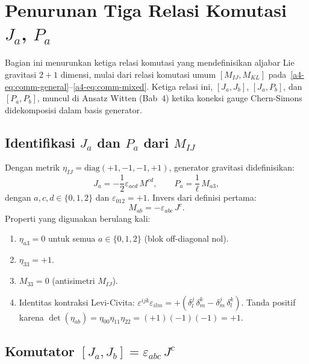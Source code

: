 \section{Penurunan Tiga Relasi Komutasi $J_a$, $P_a$}
\label{app:komutasi-JaPa}

Bagian ini menurunkan ketiga relasi komutasi yang mendefinisikan aljabar Lie gravitasi $2+1$ dimensi, mulai dari relasi komutasi umum $[M_{IJ}, M_{KL}]$ pada~\eqref{a4-eq:comm-general}--\eqref{a4-eq:comm-mixed}. Ketiga relasi ini, $[J_a,J_b]$, $[J_a,P_b]$, dan $[P_a,P_b]$, muncul di Ansatz Witten (Bab~4) ketika koneksi gauge Chern-Simons didekomposisi dalam basis generator.

\subsection{Identifikasi $J_a$ dan $P_a$ dari $M_{IJ}$}

Dengan metrik $\eta_{IJ} = \mathrm{diag}(+1,-1,-1,+1)$, generator gravitasi didefinisikan:
\begin{equation}\label{a5-eq:JaPa-def}
    J_a = -\frac{1}{2}\varepsilon_{acd}\,M^{cd}, \qquad
    P_a = \frac{1}{\ell}\,M_{a3},
\end{equation}
dengan $a, c, d \in \{0,1,2\}$ dan $\varepsilon_{012} = +1$. Invers dari definisi pertama:
\begin{equation}\label{a5-eq:Mab-inv}
    M_{ab} = -\varepsilon_{abc}\,J^c.
\end{equation}
Properti yang digunakan berulang kali:
\begin{enumerate}
    \item $\eta_{a3} = 0$ untuk semua $a \in \{0,1,2\}$ (blok off-diagonal nol).
    \item $\eta_{33} = +1$.
    \item $M_{33} = 0$ (antisimetri $M_{IJ}$).
    \item Identitas kontraksi Levi-Civita: $\varepsilon^{ijk}\varepsilon_{ilm} = +(\delta^j_l\,\delta^k_m - \delta^j_m\,\delta^k_l)$. Tanda positif karena $\det(\eta_{ab}) = \eta_{00}\eta_{11}\eta_{22} = (+1)(-1)(-1) = +1$.
\end{enumerate}

\subsection{Komutator $[J_a, J_b] = \varepsilon_{abc}\,J^c$}

